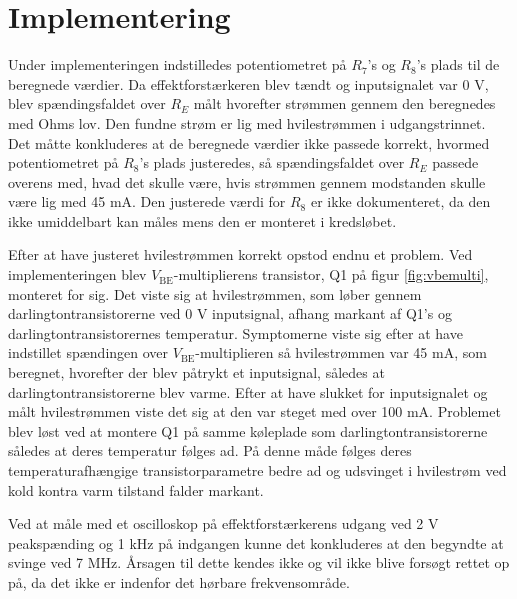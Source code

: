 \section{Implementering}
\label{effektforstaerker_implementering}

Under implementeringen indstilledes potentiometret på $R_7$'s og $R_8$'s plads til de beregnede værdier. Da effektforstærkeren blev tændt og inputsignalet var 0 V, blev spændingsfaldet over $R_E$ målt hvorefter strømmen gennem den beregnedes med Ohms lov. Den fundne strøm er lig med hvilestrømmen i udgangstrinnet. Det måtte konkluderes at de beregnede værdier ikke passede korrekt, hvormed potentiometret på $R_8$'s plads justeredes, så spændingsfaldet over $R_E$ passede overens med, hvad det skulle være, hvis strømmen gennem modstanden skulle være lig med 45 mA. Den justerede værdi for $R_8$ er ikke dokumenteret, da den ikke umiddelbart kan måles mens den er monteret i kredsløbet.

Efter at have justeret hvilestrømmen korrekt opstod endnu et problem. Ved implementeringen blev $V_\mathrm{BE}$-multiplierens transistor, Q1 på figur \ref{fig:vbemulti}, monteret for sig. Det viste sig at hvilestrømmen, som løber gennem darlingtontransistorerne ved 0 V inputsignal, afhang markant af Q1's og darlingtontransistorernes temperatur. Symptomerne viste sig efter at have indstillet spændingen over $V_\mathrm{BE}$-multiplieren så hvilestrømmen var 45 mA, som beregnet, hvorefter der blev påtrykt et inputsignal, således at darlingtontransistorerne blev varme. Efter at have slukket for inputsignalet og målt hvilestrømmen viste det sig at den var steget med over 100 mA. Problemet blev løst ved at montere Q1 på samme køleplade som darlingtontransistorerne således at deres temperatur følges ad. På denne måde følges deres temperaturafhængige transistorparametre bedre ad og udsvinget i hvilestrøm ved kold kontra varm tilstand falder markant. 

Ved at måle med et oscilloskop på effektforstærkerens udgang ved 2 V peakspænding og 1 kHz på indgangen kunne det konkluderes at den begyndte at svinge ved 7 MHz. Årsagen til dette kendes ikke og vil ikke blive forsøgt rettet op på, da det ikke er indenfor det hørbare frekvensområde.